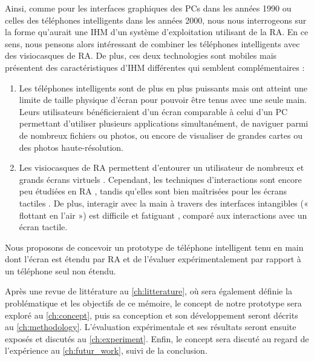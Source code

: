 
Ainsi, comme pour les interfaces graphiques des PCs dans les années 1990 ou celles des téléphones intelligents dans les années 2000, nous nous interrogeons sur la forme qu'aurait une IHM d'un système d'exploitation utilisant de la RA. En ce sens, nous pensons alors intéressant de combiner les téléphones intelligents avec des visiocasques de RA. De plus, ces deux technologies sont mobiles mais présentent des caractéristiques d'IHM différentes qui semblent complémentaires :
\begin{enumerate}
  \item Les téléphones intelligents sont de plus en plus puissants mais ont atteint une limite de taille physique d'écran pour pouvoir être tenus avec une seule main. Leurs utilisateurs bénéficieraient d'un écran comparable à celui d'un PC permettant d'utiliser plusieurs applications simultanément, de naviguer parmi de nombreux fichiers ou photos, ou encore de visualiser de grandes cartes ou des photos haute-résolution.
  \item Les visiocasques de RA permettent d'entourer un utilisateur de nombreux et grands écrans virtuels \citep{Ens2014}. Cependant, 
  les techniques d'interactions sont encore peu étudiées en RA \citep{Piumsomboon2013}, tandis qu'elles sont bien maîtrisées pour les écrans tactiles \citep{Wobbrock2009}. De plus, interagir avec la main à travers des interfaces intangibles (« flottant en l'air ») est difficile \citep{Chan2010} et fatiguant \citep{Hincapie-Ramos2014}, comparé aux interactions avec un écran tactile.
\end{enumerate}

Nous proposons de concevoir un prototype de téléphone intelligent tenu en main dont l'écran est étendu par RA et de l'évaluer expérimentalement par rapport à un téléphone seul non étendu.

Après une revue de littérature au \autoref{ch:litterature}, où sera également définie la problématique et les objectifs de ce mémoire, le concept de notre prototype sera exploré au \autoref{ch:concept}, puis sa conception et son développement seront décrits au \autoref{ch:methodology}. L'évaluation expérimentale et ses résultats seront ensuite exposés et discutés au \autoref{ch:experiment}. Enfin, le concept sera discuté au regard de l'expérience au \autoref{ch:futur_work}, suivi de la conclusion.